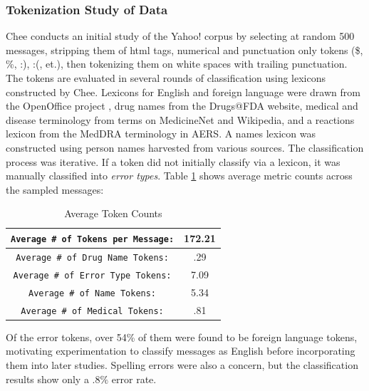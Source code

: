 \documentclass[twoside,11pt]{article}
\begin{document}
\subsubsection{Tokenization Study of Data}
Chee conducts an initial study of the Yahoo! corpus by selecting at random 500 messages, stripping them of html tags, numerical and punctuation only tokens (\$, \%, :), :(, et.), then tokenizing them on white spaces with trailing punctuation. The tokens are evaluated in several rounds of classification using lexicons constructed by Chee. Lexicons for English and foreign language were drawn from the OpenOffice project \citep{OpenOffice}, drug names from the Drugs@FDA website, medical and disease terminology from terms on MedicineNet and Wikipedia, and a reactions lexicon from the MedDRA terminology in AERS. A names lexicon was constructed using person names harvested from various sources. The classification process was iterative. If a token did not initially classify via a lexicon, it was manually classified into \textit{error types}. Table \ref{table1} shows average metric counts across the sampled messages:
\begin{table}[H]
  \centering
  \caption{Average Token Counts}
  \label{table1}
  \begin{tabular}{||c|c||}
    \hline
    \verb|Average # of Tokens per Message:| & 172.21\\
    \hline
    \verb|Average # of Drug Name Tokens:| & .29\\
    \hline
    \verb|Average # of Error Type Tokens:| & 7.09\\
    \hline
    \verb|Average # of Name Tokens:| & 5.34\\
    \hline
    \verb|Average # of Medical Tokens:| & .81\\
    \hline
  \end{tabular}
\end{table}
Of the error tokens, over 54\% of them were found to be foreign language tokens, motivating experimentation to classify messages as English before incorporating them into later studies. Spelling errors were also a concern, but the classification results show only a $.8\%$ error rate. %
\end{document}
